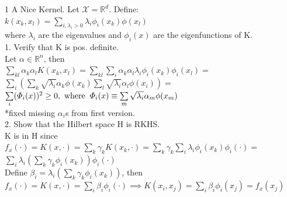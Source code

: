 \documentclass[18pt]{article}
\author{Adam Handwerger}
\begin{document}
\begin{flushleft}
1 A Nice Kernel. Let $\mathcal{X}=\mathbb{R}^d$. Define:\\
\vspace{.4cm}
\hspace{3cm} $k(x_k,x_l)=\sum\limits_{i,\lambda_i>0} \lambda_i \phi_i(x_k)\phi(x_l)$\\
\vspace{.4cm}
where $\lambda_i$ are the eigenvalues and $\phi_i(x)$ are the eigenfunctions of K.\\
\vspace{.4cm}
1. Verify that K is pos. definite.\\
\vspace{.4cm}
Let $\alpha \in \mathbb{R}^n$, then\\
\vspace{.4cm}
$\sum\limits_{kl} \alpha_k \alpha_l  K(x_k,x_l)=\sum\limits_{kl} \sum\limits_i \alpha_k \alpha_l \lambda_i \phi_i(x_k) \phi_i(x_l)=$\\
\vspace{.2cm}
$\sum\limits_i \left(\sum\limits_k \sqrt{\lambda_i}\alpha_k \phi(x_k) \sum\limits_l \sqrt{\lambda_i} \alpha_l \phi(x_i)\right)=$\\
\vspace{.4cm}
$\sum\limits_i (\varPhi_i(x))^2 \geq 0,\text{ where} \hspace{.2cm}\varPhi_i(x) \equiv \sum\limits_m \sqrt{\lambda_i}\alpha_m \phi(x_m)$\\
\vspace{.4cm}
*fixed missing $\alpha_i$s from first version.\\
\vspace{.4cm}
2. Show that the Hilbert space H is RKHS.\\
\vspace{.4cm}
K is in H since\\
\vspace{.4cm}
$f_x(\cdot)=K(x,\cdot)=\sum\limits_k \gamma_k K(x_k,\cdot)=\sum\limits_k \gamma_k \sum\limits_i \lambda_i \phi_i(x_k) \phi_i(\cdot)=$\\
$\sum\limits_i \lambda_i \left(\sum\limits_k \gamma_k \phi_i(x_k)\right) \phi_i(\cdot)$\\
\vspace{.4cm}
Define $\beta_i=\lambda_i \left(\sum\limits_k \gamma_k \phi_i(x_k)\right)$, then\\
\vspace{.4cm}
$f_x(\cdot)=K(x,\cdot)=\sum\limits_i \beta_i \phi_i(\cdot) \implies K(x_i,x_j)=\sum\limits_i \beta_i \phi_i(x_j)=f_x(x_j)$\\

\end{flushleft}
\end{document}
